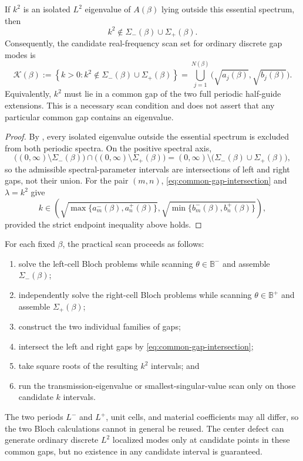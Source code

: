 \begin{corollary}
\label{cor:admissible-scan-intervals}
\label{prop:admissible-scan-intervals}
If $k^2$ is an isolated $L^2$ eigenvalue of $A(\beta)$ lying outside this
essential spectrum, then
\[
  k^2\notin\Sigma_-(\beta)\cup\Sigma_+(\beta).
\]
Consequently, the candidate real-frequency scan set for ordinary discrete
gap modes is
\begin{equation}
  \mathcal K(\beta)
  :=\left\{k>0:
  k^2\notin\Sigma_-(\beta)\cup\Sigma_+(\beta)\right\}
  =\bigcup_{j=1}^{N(\beta)}
    \bigl(\sqrt{a_j(\beta)},\sqrt{b_j(\beta)}\bigr).
  \label{eq:admissible-k-scan}
\end{equation}
Equivalently, $k^2$ must lie in a common gap of the two full periodic
half-guide extensions.  This is a necessary scan condition and does not
assert that any particular common gap contains an eigenvalue.
\end{corollary}
\begin{proof}
By , every isolated eigenvalue outside
the essential spectrum is excluded from both periodic spectra.  On the
positive spectral axis,
\[
  \bigl((0,\infty)\setminus\Sigma_-(\beta)\bigr)
  \cap
  \bigl((0,\infty)\setminus\Sigma_+(\beta)\bigr)
  =(0,\infty)\setminus
  \bigl(\Sigma_-(\beta)\cup\Sigma_+(\beta)\bigr),
\]
so the admissible spectral-parameter intervals are intersections of left and
right gaps, not their union.  For the pair $(m,n)$,
\eqref{eq:common-gap-intersection} and $\lambda=k^2$ give
\[
  k\in\left(
  \sqrt{\max\{a_m^-(\beta),a_n^+(\beta)\}},
  \sqrt{\min\{b_m^-(\beta),b_n^+(\beta)\}}
  \right),
\]
provided the strict endpoint inequality above holds.
\end{proof}

\begin{remark}
For each fixed $\beta$, the practical scan proceeds as follows:
\begin{enumerate}[leftmargin=*]
  \item solve the left-cell Bloch problems while scanning
  $\theta\in\mathbb B^-$ and assemble $\Sigma_-(\beta)$;
  \item independently solve the right-cell Bloch problems while scanning
  $\theta\in\mathbb B^+$ and assemble $\Sigma_+(\beta)$;
  \item construct the two individual families of gaps;
  \item intersect the left and right gaps by
  \eqref{eq:common-gap-intersection};
  \item take square roots of the resulting $k^2$ intervals; and
  \item run the transmission-eigenvalue or smallest-singular-value scan only
  on those candidate $k$ intervals.
\end{enumerate}
The two periods $L^-$ and $L^+$, unit cells, and material coefficients may
all differ, so the two Bloch calculations cannot in general be reused.
The center defect can generate ordinary discrete $L^2$ localized modes only
at candidate points in these common gaps, but no existence in any candidate
interval is guaranteed.
\end{remark}

